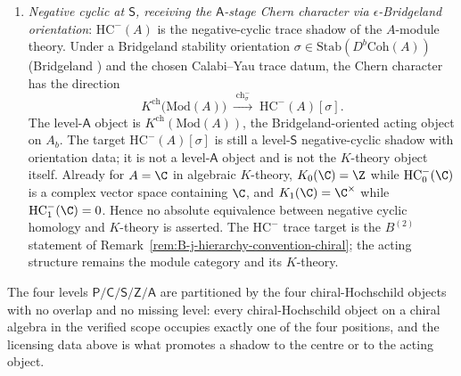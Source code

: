 \begin{theorem}
\begin{enumerate}[label=\textup{(\roman*)}]
$\mathrm{Ch}(\mathrm{Vect})$ for class~$\mathsf{M}$ algebras
(Virasoro at $c \ne 25, 26$, principal $\cW_N$, etc.):
the SS does not converge.
\item \emph{Negative cyclic at $\mathsf{S}$, receiving the
$\mathsf{A}$-stage Chern character via $\epsilon$-Bridgeland
orientation}: $\mathrm{HC}^{-}(A)$ is the negative-cyclic trace
shadow of the $A$-module theory. Under a Bridgeland stability
orientation $\sigma \in
\mathrm{Stab}(D^b\mathrm{Coh}(A))$
(Bridgeland \cite{BM01,Bridgeland07}) and the chosen
Calabi--Yau trace datum, the Chern character has the direction
\[
 K^{\mathrm{ch}}\bigl(\mathrm{Mod}(A)\bigr)
 \;\xrightarrow{\;\operatorname{ch}^{-}_{\sigma}\;}\;
 \mathrm{HC}^{-}(A)[\sigma].
\]
The level-$\mathsf{A}$ object is
$K^{\mathrm{ch}}(\mathrm{Mod}(A))$, the Bridgeland-oriented acting
object on $A_b$.  The target $\mathrm{HC}^{-}(A)[\sigma]$ is still a
level-$\mathsf{S}$ negative-cyclic shadow with orientation data; it is
not a level-$\mathsf{A}$ object and is not the $K$-theory object
itself.  Already for $A=\C$ in algebraic $K$-theory,
$K_0(\C)=\Z$ while $\mathrm{HC}^{-}_0(\C)$ is a complex vector space
containing $\C$, and $K_1(\C)=\C^\times$ while
$\mathrm{HC}^{-}_1(\C)=0$.  Hence no absolute equivalence
between negative cyclic homology and $K$-theory is asserted. The
$\mathrm{HC}^{-}$ trace target is the $B^{(2)}$ statement of
Remark~\ref{rem:B-j-hierarchy-convention-chiral}; the acting
structure remains the module category and its $K$-theory.
\end{enumerate}
The four levels $\mathsf{P}/\mathsf{C}/\mathsf{S}/\mathsf{Z}/\mathsf{A}$
are partitioned by the four chiral-Hochschild objects with no
overlap and no missing level: every chiral-Hochschild object on a
chiral algebra in the verified scope occupies exactly one of the
four positions, and the licensing data above is what promotes a
shadow to the centre or to the acting object.
\end{theorem}

